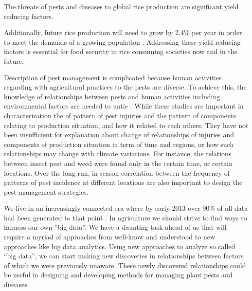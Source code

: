 

The threats of pests and diseases to global rice production are significant yield reducing factors. 

Additionally, future rice production will need to grow by 2.4\% per year in order to meet the demands of a growing population . Addressing these yield-reducing factors is essential for food security in rice consuming societies now and in the future. 


Description of pest management is complicated because human activities regarding with agricultural practices to the pests are diverse. To achieve this, the knowledge of relationships between pests and human activities including environmental factors are needed to untie . While these studies are important in characterization the of pattern of pest injuries and the pattern of components relating to production situation, and how it related to each others. They have not been insufficient for explanation about change of relationships of injuries and components of production situation in term of time and regions, or how such relationships may change with climate variations.  For instance, the  relations between insect pest and weed were found only in the certain time, or certain locations. Over the long run, in season correlation between the frequency of patterns of pest incidence at different locations are also important to design the pest management strategies.

We live in an increasingly connected era where by early 2013 over 90\% of all data had been generated to that point . In agriculture we should strive to find ways to harness our own ''big data''. We have a daunting task ahead of us that will require a myriad of approaches from well-know and understood to new approaches like big data analytics. Using new approaches to analyze so called ``big data'', we can start making new discoveries in relationships between factors of which we were previously unaware. These newly discovered relationships could be useful in designing and developing methods for managing plant pests and diseases.

